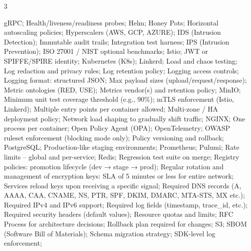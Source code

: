\documentclass[letterpaper,11pt]{article}
\begin{document}
\begin{multicols}{3}
{\begin{itemize}[leftmargin=0.1in, label={}, itemsep=0pt, parsep=0pt, topsep=0pt, partopsep=0pt]
                gRPC;
                Health/liveness/readiness probes;
                Helm;
                Honey Pots;
                Horizontal autoscaling policies;
                Hyperscalers (AWS, GCP, AZURE);
                IDS (Intrusion Detection);
                Immutable audit trails;
                Integration test harness;
                IPS (Intrusion Prevention);
                ISO 27001 / NIST optional benchmarks;
                Istio;
                JWT or SPIFFE/SPIRE identity;
                Kubernetes (K8s);
                Linkerd;
                Load and chaos testing;
                Log redaction and privacy rules;
                Log retention policy;
                Logging access controls;
                Logging format: structured JSON;
                Max payload sizes (upload/request/response);
                Metric ontologies (RED, USE);
                Metrics vendor(s) and retention policy;
                MinIO;
                Minimum unit test coverage threshold (e.g., 90\%);
                mTLS enforcement (Istio, Linkerd);
                Multiple entry points per container allowed;
                Multi-zone / HA deployment policy;
                Network load shaping to gradually shift traffic;
                NGINX;
                One process per container;
                Open Policy Agent (OPA);
                OpenTelemetry;
                OWASP ruleset enforcement (blocking mode only);
                Policy versioning and rollback;
                PostgreSQL;
                Production-like staging environments;
                Prometheus;
                Pulumi;
                Rate limits – global and per-service;
                Redis;
                Regression test suite on merge;
                Registry policies: promotion lifecycle (dev → stage → prod);
                Regular rotation and management of encryption keys: SLA of 5 minutes or less for entire network; Services reload keys upon receiving a specific signal;
                Required DNS records (A, AAAA, CAA, CNAME, NS, PTR, SPF, DKIM, DMARC, MTA-STS, MX etc.);
                Required IPv4 and IPv6 support;
                Required log fields (timestamp, trace\_id, etc.);
                Required security headers (default values);
                Resource quotas and limits;
                RFC Process for architecture decisions;
                Rollback plan required for changes;
                S3;
                SBOM (Software Bill of Materials);
                Schema migration strategy;
                SDK-level log enforcement;

\end{itemize}}
\end{multicols}
\end{document}
